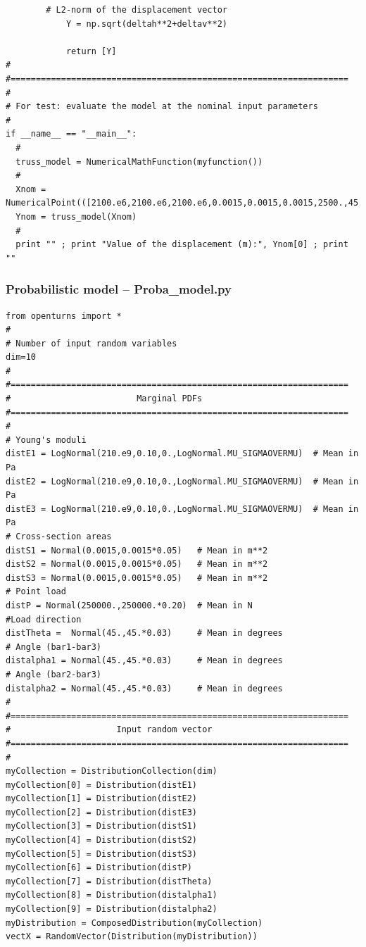 \documentclass[11pt]{article}
\begin{document}
\begin{lstlisting}
		# L2-norm of the displacement vector
        	Y = np.sqrt(deltah**2+deltav**2)

        	return [Y]
#
#===================================================================
#
# For test: evaluate the model at the nominal input parameters
#
if __name__ == "__main__":
  #
  truss_model = NumericalMathFunction(myfunction())
  #
  Xnom = NumericalPoint(([2100.e6,2100.e6,2100.e6,0.0015,0.0015,0.0015,2500.,45.,45.,45.]))
  Ynom = truss_model(Xnom)
  #
  print "" ; print "Value of the displacement (m):", Ynom[0] ; print "" 
\end{lstlisting}

\subsubsection{Probabilistic model -- \textsf{Proba\_model.py}}

\begin{lstlisting}
from openturns import *
#
# Number of input random variables
dim=10
#
#===================================================================
#                         Marginal PDFs
#===================================================================
#
# Young's moduli
distE1 = LogNormal(210.e9,0.10,0.,LogNormal.MU_SIGMAOVERMU)  # Mean in Pa
distE2 = LogNormal(210.e9,0.10,0.,LogNormal.MU_SIGMAOVERMU)  # Mean in Pa
distE3 = LogNormal(210.e9,0.10,0.,LogNormal.MU_SIGMAOVERMU)  # Mean in Pa
# Cross-section areas
distS1 = Normal(0.0015,0.0015*0.05)   # Mean in m**2
distS2 = Normal(0.0015,0.0015*0.05)   # Mean in m**2
distS3 = Normal(0.0015,0.0015*0.05)   # Mean in m**2
# Point load
distP = Normal(250000.,250000.*0.20)  # Mean in N
#Load direction
distTheta =  Normal(45.,45.*0.03)     # Mean in degrees
# Angle (bar1-bar3)
distalpha1 = Normal(45.,45.*0.03)     # Mean in degrees
# Angle (bar2-bar3)
distalpha2 = Normal(45.,45.*0.03)     # Mean in degrees
#
#===================================================================
#                     Input random vector
#===================================================================
#
myCollection = DistributionCollection(dim)
myCollection[0] = Distribution(distE1)
myCollection[1] = Distribution(distE2)
myCollection[2] = Distribution(distE3)
myCollection[3] = Distribution(distS1)
myCollection[4] = Distribution(distS2)
myCollection[5] = Distribution(distS3)
myCollection[6] = Distribution(distP)
myCollection[7] = Distribution(distTheta)
myCollection[8] = Distribution(distalpha1)
myCollection[9] = Distribution(distalpha2)
myDistribution = ComposedDistribution(myCollection)
vectX = RandomVector(Distribution(myDistribution))
\end{lstlisting}
\end{document}

